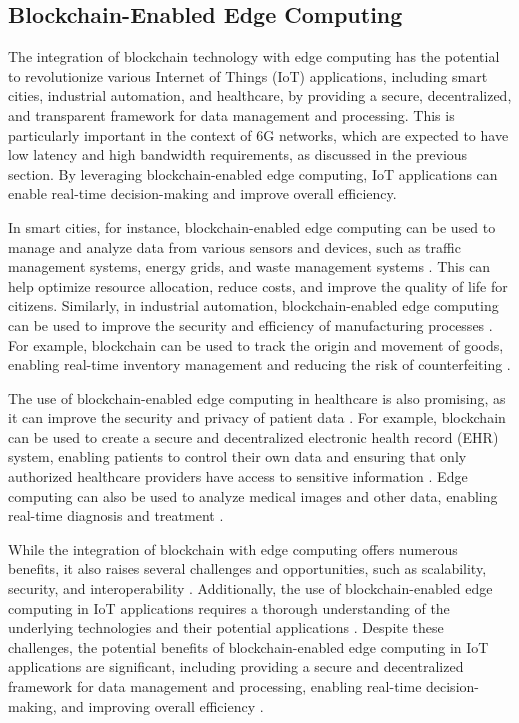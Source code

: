 \documentclass[11pt]{article}
\begin{document}
\subsection{Blockchain-Enabled Edge Computing}

The integration of blockchain technology with edge computing has the potential to revolutionize various Internet of Things (IoT) applications, including smart cities, industrial automation, and healthcare, by providing a secure, decentralized, and transparent framework for data management and processing. This is particularly important in the context of 6G networks, which are expected to have low latency and high bandwidth requirements, as discussed in the previous section. By leveraging blockchain-enabled edge computing, IoT applications can enable real-time decision-making and improve overall efficiency.

In smart cities, for instance, blockchain-enabled edge computing can be used to manage and analyze data from various sensors and devices, such as traffic management systems, energy grids, and waste management systems \cite{ref146}. This can help optimize resource allocation, reduce costs, and improve the quality of life for citizens. Similarly, in industrial automation, blockchain-enabled edge computing can be used to improve the security and efficiency of manufacturing processes \cite{ref147}. For example, blockchain can be used to track the origin and movement of goods, enabling real-time inventory management and reducing the risk of counterfeiting \cite{ref114}.

The use of blockchain-enabled edge computing in healthcare is also promising, as it can improve the security and privacy of patient data \cite{ref148}. For example, blockchain can be used to create a secure and decentralized electronic health record (EHR) system, enabling patients to control their own data and ensuring that only authorized healthcare providers have access to sensitive information \cite{ref149}. Edge computing can also be used to analyze medical images and other data, enabling real-time diagnosis and treatment \cite{ref62}.

While the integration of blockchain with edge computing offers numerous benefits, it also raises several challenges and opportunities, such as scalability, security, and interoperability \cite{ref150}. Additionally, the use of blockchain-enabled edge computing in IoT applications requires a thorough understanding of the underlying technologies and their potential applications \cite{ref22}. Despite these challenges, the potential benefits of blockchain-enabled edge computing in IoT applications are significant, including providing a secure and decentralized framework for data management and processing, enabling real-time decision-making, and improving overall efficiency \cite{ref137}.
\end{document}

